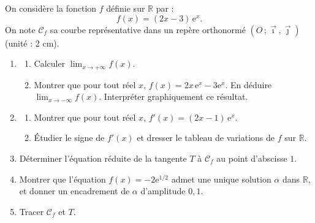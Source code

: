 \documentclass[11pt]{article}
\begin{document}
\begin{exercice}
On considère la fonction $f$ définie sur $\mathbb{R}$ par :
\[ f(x)=(2x-3)\,\mathrm{e}^{x}. \]
On note $\mathcal{C}_{f}$ sa courbe représentative dans un repère orthonormé $(O\,;\vec{\imath},\vec{\jmath})$ (unité : 2 cm).
\begin{enumerate}
\item \begin{enumerate}
\item Calculer $\displaystyle\lim_{x\to +\infty}f(x)$.
\item Montrer que pour tout réel $x$, $f(x)=2x\,\mathrm{e}^{x}-3\mathrm{e}^{x}$. En déduire $\displaystyle\lim_{x\to -\infty}f(x)$. Interpréter graphiquement ce résultat.
\end{enumerate}
\item \begin{enumerate}
\item Montrer que pour tout réel $x$, $f'(x)=(2x-1)\,\mathrm{e}^{x}$.
\item Étudier le signe de $f'(x)$ et dresser le tableau de variations de $f$ sur $\mathbb{R}$.
\end{enumerate}
\item Déterminer l'équation réduite de la tangente $T$ à $\mathcal{C}_{f}$ au point d'abscisse $1$.
\item Montrer que l'équation $f(x)=-2\mathrm{e}^{1/2}$ admet une unique solution $\alpha$ dans $\mathbb{R}$, et donner un encadrement de $\alpha$ d'amplitude $0,1$.
\item Tracer $\mathcal{C}_{f}$ et $T$.
\end{enumerate}
\end{exercice}
\end{document}
